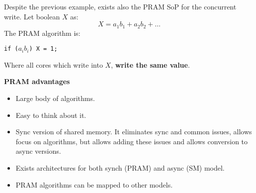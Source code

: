 \noindent
Despite the previous example, exists also the PRAM SoP for the concurrent write. Let boolean $X$ as:
\begin{equation*}
    X = a_{1}b_{1} + a_{2}b_{2} + \dots
\end{equation*}
The PRAM algorithm is:
\begin{center}
    \texttt{if ($a_{i}b_{i}$) X = 1;}
\end{center}
Where all cores which write into $X$, \textbf{write the same value}.

\newpage

\begin{flushleft}
    \textcolor{Green3}{ \textbf{PRAM advantages}}
\end{flushleft}
\begin{itemize}
    \item Large body of algorithms.
    \item Easy to think about it.
    \item Sync version of shared memory. It eliminates sync and common issues, allows focus on algorithms, but allows adding these issues and allows conversion to async versions.
    \item Exists architectures for both synch (PRAM) and async (SM) model.
    \item PRAM algorithms can be mapped to other models.
\end{itemize}